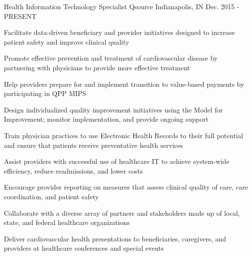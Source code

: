 

\begin{cventries}


  \cventry
    {Health Information Technology Specialist} %
    {Qsource} %
    {Indianapolis, IN} %
    {Dec. 2015 - PRESENT} %
    {
      \begin{cvitems} %
      \item {Facilitate data-driven beneficiary and provider initiatives designed to increase patient safety and improve clinical quality}
      \item {Promote effective prevention and treatment of cardiovascular disease by partnering with physicians to provide more effective treatment}
        \item {Help providers prepare for and implement transition to value-based payments by participating in QPP MIPS}
    \item {Design individualized quality improvement initiatives using the Model for Improvement; monitor implementation, and provide ongoing support}
    \item {Train physician practices to use Electronic Health Records to their full potential and ensure that patients receive preventative health services}
    \item {Assist providers with successful use of healthcare IT to achieve system-wide efficiency, reduce readmissions, and lower costs}
    \item {Encourage provider reporting on measures that assess clinical quality of care, care coordination, and patient safety}
    \item {Collaborate with a diverse array of partners and stakeholders made up of local, state, and federal healthcare organizations}
    \item {Deliver cardiovascular health presentations to beneficiaries, caregivers, and providers at healthcare conferences and special events}
  \end{cvitems}
    }


\end{cventries}
